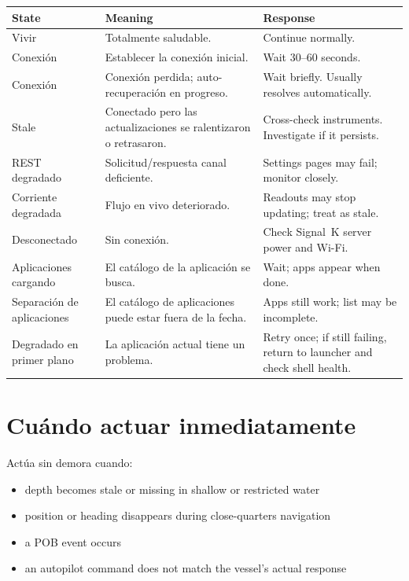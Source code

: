 \begin{longtable}{L{3.2cm}L{4.8cm}L{5.7cm}}
\toprule
{}
\color{white}\sffamily\bfseries State &
\color{white}\sffamily\bfseries Meaning &
\color{white}\sffamily\bfseries Response \\
\midrule
Vivir&Totalmente saludable.&
  Continue normally. \\
Conexión&Establecer la conexión inicial.&
  Wait 30--60 seconds. \\
Conexión&Conexión perdida; auto-recuperación en progreso.&
  Wait briefly. Usually resolves automatically. \\
Stale&Conectado pero las actualizaciones se ralentizaron o retrasaron.&
  Cross-check instruments. Investigate if it persists. \\
REST degradado&Solicitud/respuesta canal deficiente.&
  Settings pages may fail; monitor closely. \\
Corriente degradada&Flujo en vivo deteriorado.&
  Readouts may stop updating; treat as stale. \\
Desconectado&Sin conexión.&
  Check Signal~K server power and Wi-Fi. \\
Aplicaciones cargando&El catálogo de la aplicación se busca.&
  Wait; apps appear when done. \\
Separación de aplicaciones&El catálogo de aplicaciones puede estar fuera de la fecha.&
  Apps still work; list may be incomplete. \\
Degradado en primer plano&La aplicación actual tiene un problema.&
  Retry once; if still failing, return to launcher and check shell health. \\
\bottomrule
\end{longtable}

\section{Cuándo actuar inmediatamente}

Actúa sin demora cuando:

\begin{itemize}
  \item depth becomes stale or missing in shallow or restricted water
  \item position or heading disappears during close-quarters navigation
  \item a POB event occurs
  \item an autopilot command does not match the vessel's actual response
\end{itemize}

